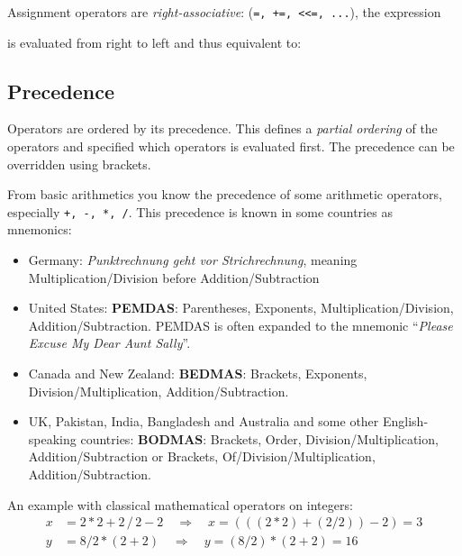 \begin{example}
  Assignment operators are \emph{right-associative}: (\texttt{=, +=, <<=, ...}), \ie the expression

 is evaluated from right to left and thus equivalent to: 
\end{example}

\subsection{Precedence\label{sec:operator-precedence}}
Operators are ordered by its precedence. This defines a \emph{partial ordering} of the operators and specified which operators is evaluated first. The precedence can be overridden using brackets.

From basic arithmetics you know the precedence of some arithmetic operators, especially \texttt{+, -, *, /}. This precedence is known in some countries as mnemonics:
\begin{itemize}
  \item Germany: \textit{Punktrechnung geht vor Strichrechnung}, meaning Multiplication/Division before Addition/Subtraction

  \item United States: \textbf{PEMDAS}: Parentheses, Exponents, Multiplication/Division, Addition/Subtraction. PEMDAS is often expanded to the mnemonic ``\textit{Please Excuse My Dear Aunt Sally}''.

  \item Canada and New Zealand: \textbf{BEDMAS}: Brackets, Exponents, Division/Multiplication, Addition/Subtraction.

  \item UK, Pakistan, India, Bangladesh and Australia and some other English-speaking countries: \textbf{BODMAS}: Brackets, Order, Division/Multiplication, Addition/Subtraction or Brackets, Of/Division/Multiplication, Addition/Subtraction.
\end{itemize}

\begin{example}
  An example with classical mathematical operators on integers:
  \[\begin{split}
    x &= 2 * 2 + 2\, /\, 2 - 2\quad\Rightarrow\quad x = \left(\left(\left(2 * 2\right) + \left(2 / 2\right)\right) - 2\right) = 3 \\
    y &= 8 / 2 * (2 + 2)\quad\Rightarrow\quad y = (8 / 2) * (2 + 2) = 16
  \end{split}\]
\end{example}

